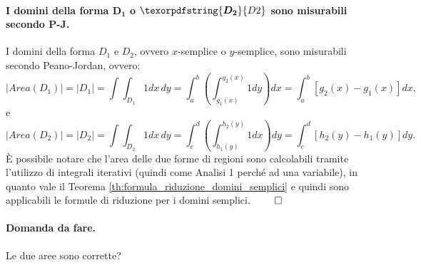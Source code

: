 \paragraph{I domini della forma $\boldsymbol{D_1}$ o $\texorpdfstring{\boldsymbol{D_2}}{D2}$ sono misurabili secondo P-J.} I domini della forma $D_1$ e $D_2$, ovvero $x$-semplice o $y$-semplice, sono misurabili secondo Peano-Jordan, ovvero:
\begin{equation*}
	|Area(D_1)| = |D_1| = \int\int_{D_1} 1 dx\, dy = \int_a^b\left(\int_{g_1(x)}^{g_2(x)} 1dy\right)dx = \int_a^b[g_2(x)-g_1(x)] dx,
\end{equation*}
e
\begin{equation*}
	|Area(D_2)| =|D_2| = \int\int_{D_2} 1 dx\,dy = \int_c^d \left(\int_{h_1(y)}^{h_2(y)}1 dx\right)dy = \int _c^d[h_2(y) - h_1(y)] dy.
\end{equation*}
È possibile notare che l'area delle due forme di regioni sono calcolabili tramite l'utilizzo di integrali iterativi (quindi come Analisi 1 perché ad una variabile), in quanto vale il Teorema \ref{th:formula_riduzione_domini_semplici} e quindi sono applicabili le formule di riduzione per i domini semplici. $\qed$

\paragraph{Domanda da fare.} Le due aree sono corrette?

